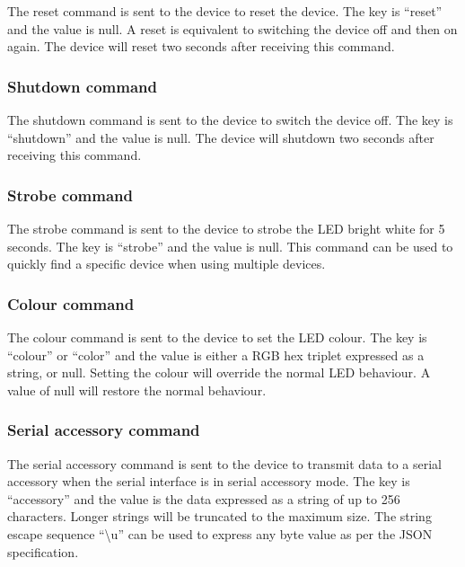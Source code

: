 The reset command is sent to the device to reset the device.  The key is \enquote{reset} and the value is null.  A reset is equivalent to switching the device off and then on again.  The device will reset two seconds after receiving this command.


\subsubsection{Shutdown command}

The shutdown command is sent to the device to switch the device off.  The key is \enquote{shutdown} and the value is null.  The device will shutdown two seconds after receiving this command.


\subsubsection{Strobe command}
\label{sec:strobeCommand}

The strobe command is sent to the device to strobe the \ac{LED} bright white for 5 seconds.  The key is \enquote{strobe} and the value is null.  This command can be used to quickly find a specific device when using multiple devices.


\subsubsection{Colour command}
\label{sec:colourCommand}

The colour command is sent to the device to set the \ac{LED} colour.  The key is \enquote{colour} or \enquote{color} and the value is either a \ac{RGB} hex triplet expressed as a string, or null.  Setting the colour will override the normal \ac{LED} behaviour.  A value of null will restore the normal behaviour.


\subsubsection{Serial accessory command}

The serial accessory command is sent to the device to transmit data to a serial accessory when the serial interface is in serial accessory mode.  The key is \enquote{accessory} and the value is the data expressed as a string of up to 256 characters.  Longer strings will be truncated to the maximum size.  The string escape sequence \enquote{\textbackslash u} can be used to express any byte value as per the \ac{JSON} specification.

